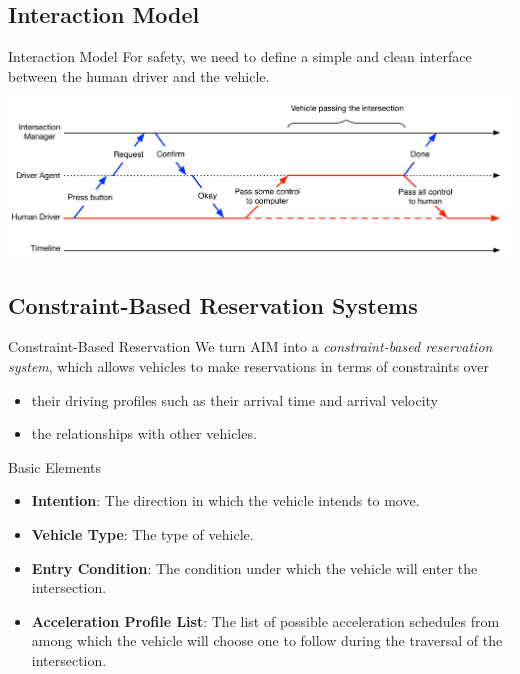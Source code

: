 \documentclass{beamer}
\begin{document}
\subsection{Interaction Model}

\begin{frame}{Interaction Model}
For safety, we need to define a simple and clean interface between the
human driver and the vehicle.\pause

\includegraphics[width=\textwidth]{figures/interaction}
\end{frame}

\subsection{Constraint-Based Reservation Systems}

\begin{frame}{Constraint-Based Reservation}
We turn AIM into a \emph{constraint-based reservation system}, which
allows vehicles to make reservations in terms of constraints over
\begin{itemize}
\item their driving profiles such as their arrival time and arrival velocity
\item the relationships with other vehicles.
\end{itemize}
\end{frame}

\begin{frame}{Basic Elements}
\begin{itemize}
\item{\bf Intention}: The direction in which the vehicle intends to
move.\pause
\item{\bf Vehicle Type}: The type of vehicle.\pause
\item{\bf Entry Condition}: The condition under which the vehicle will
enter the intersection.\pause
\item{\bf Acceleration Profile List}: The list of possible
acceleration schedules from among which the vehicle will choose one to
follow during the traversal of the intersection.
\end{itemize}
\end{frame}
\end{document}
